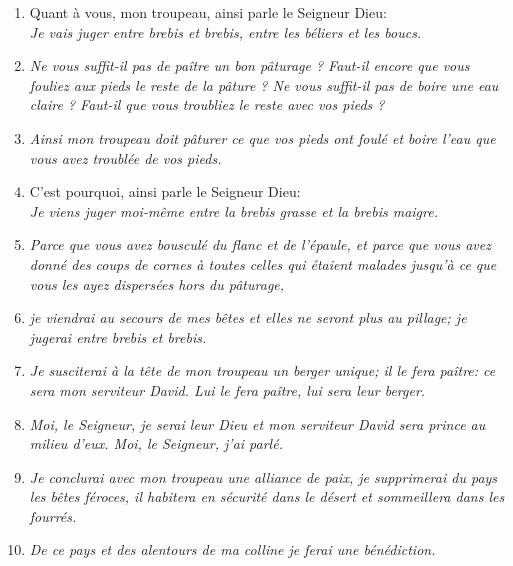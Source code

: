 \begin{enumerate}[leftmargin=\psleftmargin, labelsep = \pslabelsep, label={\arabic*}, font=\color{\pscolor}\small\textsuperscript, parsep=0em, itemsep=0em, topsep=0em ]
        \subsection*{Prophétie contre les membres égoïstes du troupeau}
  \item {}Quant à vous, mon troupeau, ainsi parle le Seigneur Dieu: \\
        \textit{Je vais juger entre brebis et brebis, entre les béliers et les boucs.}
  \item {}\textit{Ne vous suffit-il pas de paître un bon pâturage ? \brk
          Faut-il encore que vous fouliez aux pieds le reste de la pâture ? \brk
          Ne vous suffit-il pas de boire une eau claire ? \brk
          Faut-il que vous troubliez le reste avec vos pieds ?}
  \item {}\textit{Ainsi mon troupeau doit pâturer ce que vos pieds ont foulé \brk
          et boire l’eau que vous avez troublée de vos pieds.} \verseSpace
  \item {}C’est pourquoi, ainsi parle le Seigneur Dieu: \\
        \textit{Je viens juger moi-même entre la brebis grasse et la brebis maigre.}
  \item {}\textit{Parce que vous avez bousculé du flanc et de l’épaule, \brk
          et parce que vous avez donné des coups de cornes à toutes celles qui étaient malades \brk
          jusqu’à ce que vous les ayez dispersées hors du pâturage,}
  \item {}\textit{je viendrai au secours de mes bêtes et elles ne seront plus au pillage; \brk
          je jugerai entre brebis et brebis.}
  \item {}\textit{Je susciterai à la tête de mon troupeau un berger unique; \brk
          il le fera paître: \brk
          ce sera mon serviteur David. \brk
          Lui le fera paître, \brk
          lui sera leur berger.}
  \item {}\textit{Moi, le Seigneur, je serai leur Dieu \brk
          et mon serviteur David sera prince au milieu d’eux. \brk
          Moi, le Seigneur, j’ai parlé.}
  \item {}\textit{Je conclurai avec mon troupeau une alliance de paix, \brk
          je supprimerai du pays les bêtes féroces, \brk
          il habitera en sécurité dans le désert et sommeillera dans les fourrés.}
  \item {}\textit{De ce pays et des alentours de ma colline je ferai une bénédiction. \brk
}
\end{enumerate}
